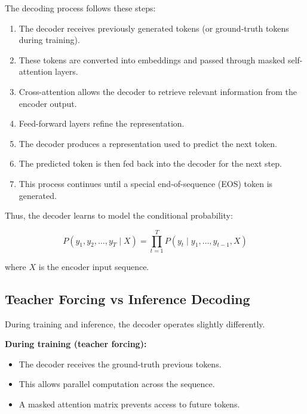 \documentclass[11pt]{article}
\begin{document}
The decoding process follows these steps:

\begin{enumerate}

\item The decoder receives previously generated tokens (or ground-truth tokens during training).

\item These tokens are converted into embeddings and passed through masked self-attention layers.

\item Cross-attention allows the decoder to retrieve relevant information from the encoder output.

\item Feed-forward layers refine the representation.

\item The decoder produces a representation used to predict the next token.

\item The predicted token is then fed back into the decoder for the next step.

\item This process continues until a special end-of-sequence (EOS) token is generated.

\end{enumerate}

Thus, the decoder learns to model the conditional probability:

\[
P(y_1, y_2, \ldots, y_T \mid X)
=
\prod_{t=1}^{T}
P(y_t \mid y_1,\ldots,y_{t-1},X)
\]

where $X$ is the encoder input sequence.

\subsection{Teacher Forcing vs Inference Decoding}

During training and inference, the decoder operates slightly differently.

\textbf{During training (teacher forcing):}

\begin{itemize}

\item The decoder receives the ground-truth previous tokens.
\item This allows parallel computation across the sequence.
\item A masked attention matrix prevents access to future tokens.

\end{itemize}
\end{document}
